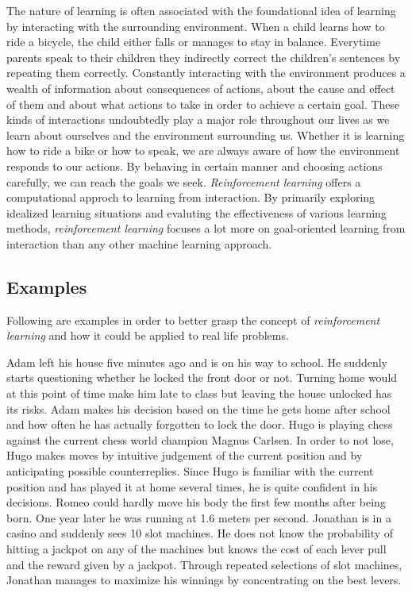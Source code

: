 \documentclass[titlepage]{article}
\begin{document}
The nature of learning is often associated with the foundational idea of learning by interacting with the surrounding environment. When a child learns how to ride a bicycle, the child either falls or manages to stay in balance. Everytime parents speak to their children they indirectly correct the children's sentences by repeating them correctly. Constantly interacting with the environment produces a wealth of information about consequences of actions, about the cause and effect of them and about what actions to take in order to achieve a certain goal. These kinds of interactions undoubtedly play a major role throughout our lives as we learn about ourselves and the environment surrounding us. Whether it is learning how to ride a bike or how to speak, we are always aware of how the environment responds to our actions. By behaving in certain manner and choosing actions carefully, we can reach the goals we seek. \emph{Reinforcement learning} offers a computational approch to learning from interaction. By primarily exploring idealized learning situations and evaluting the effectiveness of various learning methods, \emph{reinforcement learning} focuses a lot more on goal-oriented learning from interaction than any other machine learning approach. 

\subsection{Examples}

\vskip 0.3cm

Following are examples in order to better grasp the concept of \emph{reinforcement learning} and how it could be applied to real life problems.

\vskip 0.3cm

\begin{outline}
    \1 Adam left his house five minutes ago and is on his way to school. He suddenly starts questioning whether he locked the front door or not. Turning home would at this point of time make him late to class but leaving the house unlocked has its risks. Adam makes his decision based on the time he gets home after school and how often he has actually forgotten to lock the door. 
    \1 Hugo is playing chess against the current chess world champion Magnus Carlsen. In order to not lose, Hugo makes moves by intuitive judgement of the current position and by anticipating possible counterreplies. Since Hugo is familiar with the current position and has played it at home several times, he is quite confident in his decisions. 
    \1 Romeo could hardly move his body the first few months after being born. One year later he was running at 1.6 meters per second.
    \1 Jonathan is in a casino and suddenly sees 10 slot machines. He does not know the probability of hitting a jackpot on any of the machines but knows the cost of each lever pull and the reward given by a jackpot. Through repeated selections of slot machines, Jonathan manages to maximize his winnings by concentrating on the best levers. 
\end{outline}
\end{document}

